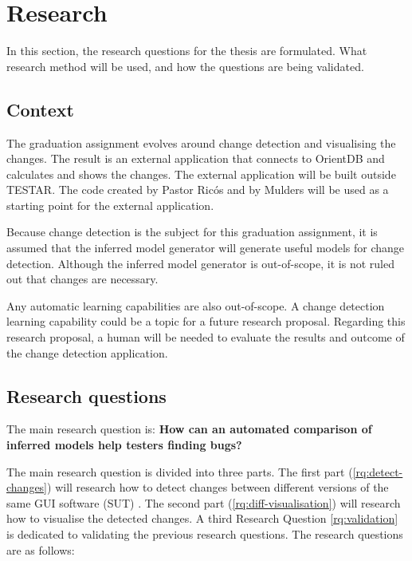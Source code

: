 \section{Research} \label{questions}
In this section, the research questions for the thesis are formulated. What research method will be used, and how the questions are being validated.

\subsection{Context}
The graduation assignment evolves around change detection and visualising the changes. The result is an external application that connects to OrientDB and calculates and shows the changes. The external application will be built outside TESTAR. The code created by Pastor Ricós and by Mulders will be used as a starting point for the external application. 

Because change detection is the subject for this graduation assignment, it is assumed that the inferred model generator will generate useful models for change detection. Although the inferred model generator is out-of-scope, it is not ruled out that changes are necessary.

Any automatic learning capabilities are also out-of-scope. A change detection learning capability could be a topic for a future research proposal. Regarding this research proposal, a human will be needed to evaluate the results and outcome of the change detection application.

\subsection{Research questions} \label{research-questions}
        
The main research question is: \textbf{How can an automated comparison of inferred models help testers finding bugs?}

The main research question is divided into three parts. The first part (\ref{rq:detect-changes}) will research how to detect changes between different versions of the same GUI software (SUT) \cite{testar-todo}. The second part (\ref{rq:diff-visualisation}) will research how to visualise the detected changes. A third Research Question \ref{rq:validation} is dedicated to validating the previous research questions. The research questions are as follows: 

